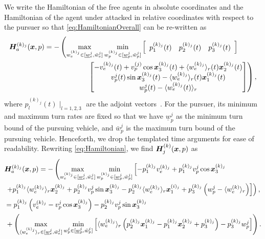 We write the Hamiltonian of the free agents in absolute coordinates and the Hamiltonian of the agent under attacked in relative coordinates with respect to the pursuer so that \eqref{eq:HamiltonianOverall} can be re-written as
%
\begin{align}
\hamfunc^{(k)_j}_a(\state, p)&= - \left(\max_{w_e^{(k)_j} \in [\underline{w}_e^j, \bar{w}_e^j]}  \min_{w_p^{(k)_j}  \in [\underline{w}_p^{j}, \bar{w}_p^j]}  \left[\begin{array}{ccc} p_1^{(k)_j}(t) & p_2^{(k)_j}(t) & p_3^{(k)_j}(t) \end{array}\right] \right. \nonumber \\ 
%
& \qquad\qquad\qquad \left. 
\begin{bmatrix}
-v_e^{(k)_j}(t) + v_p^{(j)} \cos \state_3^{(k)_j}(t) + \langle w_e^{(k)_j} \rangle_r (t) \state_2^{(k)_j}(t)
\\ 
v_p^{j}(t)\sin \state_3^{(k)_j}(t) -\langle w_e^{(k)_j} \rangle_r (t) \state_1^{(k)_j}(t)
\\ 
w_p^j(t) - \langle w_e^{(k)_j}(t) \rangle_r
\end{bmatrix}\right),
\label{eq:Hamiltonian}
\end{align}
%
where $p_l^{(k)_j}(t)\mid_{l=1,2,3}$ are the adjoint vectors~\cite{Merz1972}. For the pursuer, its minimum and maximum turn rates are fixed so that we have $\underline{w}_p^{j}$ as the minimum turn bound of the pursuing vehicle, and $\bar{w}_p^j$ is the maximum turn bound of the pursuing vehicle. Henceforth, we drop the templated time arguments for ease of readability. Rewriting \eqref{eq:Hamiltonian}, we find $\bm{H}^{(k)}_j(\bm{x}, p)$ as
%
\begin{align}
\begin{split}
&\hamfunc^{(k)_j}_a(\state, p)=- \left(\max_{w_e^{(k)_j} \in [\underline{w}_e^j, \bar{w}_e^j]}  \min_{w_p^{(k)_j}  \in [\underline{w}_p^{j}, \bar{w}_p^j]}  
\left[
-p_1^{(k)_j} v_e^{(k)_j} + p_1^{(k)_j} v_p^{j} \cos \state_3^{(k)_j} 
\right. \right.  \\ 
%
& \left. \left. +  p_1^{(k)_j}\langle w_e^{(k)_j} \rangle_r \state_2^{(k)_j} 
%
+ p_2^{(k)_j} v_p^{j} \sin \state_3^{(k)_j} - p_2^{(k)_j} \langle w_e^{(k)_j} \rangle_r  \state_1^{(i)_j} 
%
+ p_3^{(k)_j}\left(w_p^j - \langle w_e^{(k)} \rangle_r\right)
\right] 
%
\right),
\\
%
&=p_1^{(k)_j} \left(v_e^{(k)_j} - v_p^{j} \cos \state_3^{(k)_j}\right) -  p_2^{(k)_j} v_p^{j} \sin \state_3^{(k)_j}  \\
%
& \, + \left(		
\max_{\langle w_e^{(k)_j}\rangle_r \in [\underline{w}_e^j, \bar{w}_e^j]}  \min_{w_p^{j}  \in [\underline{w}_p^{j}, \bar{w}_p^j]} \begin{bmatrix}
\langle w_e^{(k)_j}\rangle_r \left(p_2^{(k)_j} \state_1^{(k)_j} - p_1^{(k)_j}  \state_2^{(k)_j} + p_3^{(k)_j}\right) 
% 
- p_3^{(k)_j} w_p^j 
\end{bmatrix}
\right).
\end{split}
%
\label{eq:ham_flock_interm}
\end{align}
